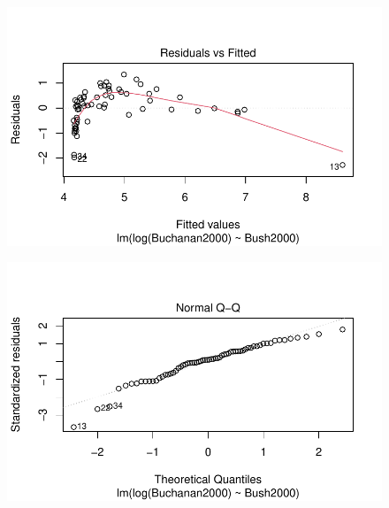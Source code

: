 \documentclass[
  letterpaper,
  DIV=11,
  numbers=noendperiod]{scrartcl}
\begin{document}
\begin{figure}[H]

{\centering \includegraphics{case_study_1_files/figure-pdf/unnamed-chunk-4-11.pdf}

}

\end{figure}

\begin{figure}[H]

{\centering \includegraphics{case_study_1_files/figure-pdf/unnamed-chunk-4-12.pdf}

}

\end{figure}
\end{document}
